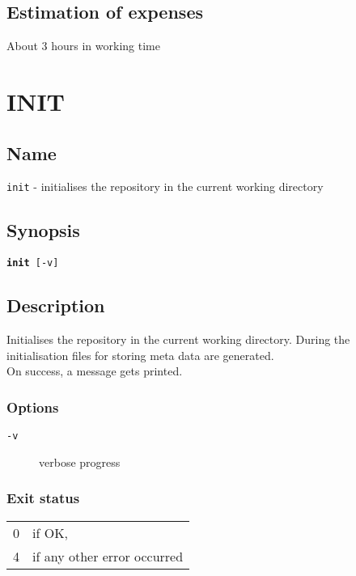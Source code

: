\documentclass{article} %
\begin{document}
		\subsection{Estimation of expenses}
		About 3 hours in working time
		\newpage
		
		\section*{INIT}
		\subsection*{Name}
		\texttt{init} - initialises the repository in the current working directory
		\subsection*{Synopsis}
		\texttt{\textbf{init} [-v]}
		\subsection*{Description}
		Initialises the repository in the current working directory.
		During the initialisation files for storing meta data are generated.\\
		
		\noindent On success, a message gets printed.
		\subsubsection*{Options}
		\begin{description}
			\item[\texttt{-v}] verbose progress
		\end{description}
		
		\subsubsection*{Exit status}
		\begin{tabular}{ll}
			0 &  if OK,\\ 
			4 &  if any other error occurred\\
		\end{tabular}
\end{document}
